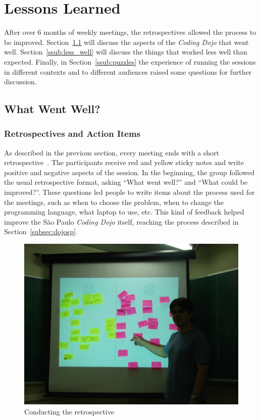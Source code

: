 \section{Lessons Learned}\label{sec:lessons_learned}

After over 6 months of weekly meetings, the retrospectives allowed the
process to be improved. Section~\ref{ssub:well} will discuss the
aspects of the \emph{Coding Dojo} that went
well. Section~\ref{ssub:less_well} will discuss the things that worked
less well than expected. Finally, in Section~\ref{ssub:puzzles} the
experience of running the sessions in different contexts and to
different audiences raised some questions for further discussion.

\subsection{What Went Well?}\label{ssub:well}

\subsubsection{Retrospectives and Action Items}

As described in the previous section, every meeting ends with a
short retrospective~\cite{Retro}. The participants receive red and yellow sticky
notes and write positive and negative aspects of the session. In the
beginning, the group followed the usual retrospective format,
asking ``What went well?'' and ``What could be improved?''.
These questions led people to write items about the process used for
the meetings, such as when to choose the problem, when to change the
programming language, what laptop to use, etc. This kind of feedback
helped improve the São Paulo \emph{Coding Dojo} itself, reaching the
process described in Section~\ref{subsec:dojosp}.

\begin{figure}[htp]
\centering
\includegraphics[width=\columnwidth]{retrospective}
\caption{Conducting the retrospective}\label{fig:retrospective}
\end{figure}

